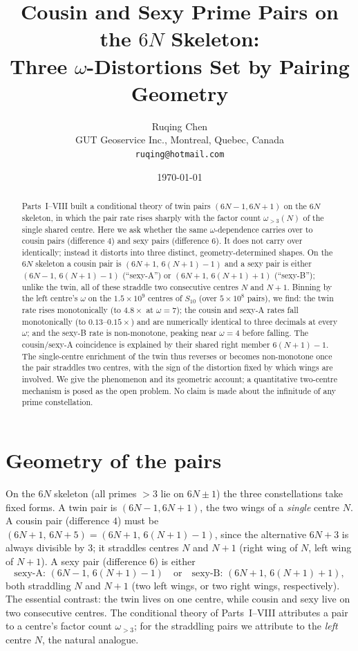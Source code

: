 \documentclass[11pt]{article}
\title{Cousin and Sexy Prime Pairs on the $6N$ Skeleton:\\
Three $\omega$-Distortions Set by Pairing Geometry}
\author{Ruqing Chen\\
\small GUT Geoservice Inc., Montreal, Quebec, Canada\\
\small \texttt{ruqing@hotmail.com}}
\date{\today}
\begin{document}
\maketitle

\begin{abstract}
Parts~I--VIII built a conditional theory of twin pairs $(6N{-}1,6N{+}1)$ on the
$6N$ skeleton, in which the pair rate rises sharply with the factor count
$\omega_{>3}(N)$ of the single shared centre. Here we ask whether the same
$\omega$-dependence carries over to cousin pairs (difference $4$) and sexy pairs
(difference $6$). It does not carry over identically; instead it distorts into
three distinct, geometry-determined shapes. On the $6N$ skeleton a cousin pair is
$(6N{+}1,\,6(N{+}1){-}1)$ and a sexy pair is either
$(6N{-}1,\,6(N{+}1){-}1)$ (``sexy-A'') or $(6N{+}1,\,6(N{+}1){+}1)$ (``sexy-B'');
unlike the twin, all of these straddle two consecutive centres $N$ and $N{+}1$.
Binning by the left centre's $\omega$ on the $1.5\times10^{9}$ centres of $S_{10}$
(over $5\times10^{8}$ pairs), we find: the twin rate rises monotonically (to
$4.8\times$ at $\omega=7$); the cousin and sexy-A rates fall monotonically (to
$0.13$--$0.15\times$) and are numerically identical to three decimals at every
$\omega$; and the sexy-B rate is non-monotone, peaking near $\omega=4$ before
falling. The cousin/sexy-A coincidence is explained by their shared right member
$6(N{+}1){-}1$. The single-centre enrichment of the twin thus reverses or becomes
non-monotone once the pair straddles two centres, with the sign of the distortion
fixed by which wings are involved. We give the phenomenon and its geometric
account; a quantitative two-centre mechanism is posed as the open problem. No
claim is made about the infinitude of any prime constellation.
\end{abstract}

\section{Geometry of the pairs}

On the $6N$ skeleton (all primes $>3$ lie on $6N\pm1$) the three constellations
take fixed forms. A twin pair is $(6N{-}1,6N{+}1)$, the two wings of a
\emph{single} centre $N$. A cousin pair (difference $4$) must be
$(6N{+}1,\,6N{+}5)=(6N{+}1,\,6(N{+}1){-}1)$, since the alternative $6N{+}3$ is
always divisible by $3$; it straddles centres $N$ and $N{+}1$ (right wing of $N$,
left wing of $N{+}1$). A sexy pair (difference $6$) is either
\[
  \text{sexy-A: }(6N{-}1,\,6(N{+}1){-}1)\quad\text{or}\quad
  \text{sexy-B: }(6N{+}1,\,6(N{+}1){+}1),
\]
both straddling $N$ and $N{+}1$ (two left wings, or two right wings,
respectively). The essential contrast: the twin lives on one centre, while
cousin and sexy live on two consecutive centres. The conditional theory of
Parts~I--VIII attributes a pair to a centre's factor count $\omega_{>3}$; for the
straddling pairs we attribute to the \emph{left} centre $N$, the natural analogue.
\end{document}
